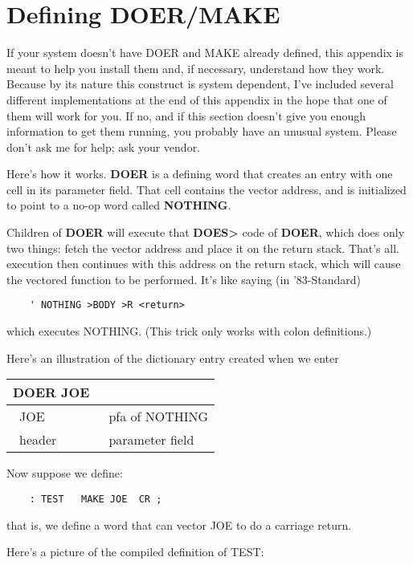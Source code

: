 \chapter{Defining
DOER/MAKE}
If your system doesn't have DOER and MAKE
already defined, this appendix
is meant to help you install them and, if necessary, understand
how they work.  Because by its nature this construct is system
dependent, I've included several different implementations at the end of
this appendix in the hope that one of them will work for you.  If no, and if
this section doesn't give you enough information to get them running,
you probably have an unusual system.  Please don't ask me for help; ask
your \Forth{} vendor.

Here's how it works.  {\bf DOER} is a defining word that creates an entry
with one cell in its parameter field. That cell contains the vector address,
and is initialized to point to a no-op word called {\bf NOTHING}.

Children of {\bf DOER} will execute that {\bf DOES> } code of {\bf DOER}, which
does only two things:  fetch the vector address and place it on the return
stack.  That's all.  \Forth{} execution then continues with this address on
the return stack, which will cause the vectored function to be performed.
It's like saying (in '83-Standard)
\begin{verbatim}
    ' NOTHING >BODY >R <return>
\end{verbatim}
which executes NOTHING.  (This trick only works with colon definitions.)

Here's an illustration of the dictionary entry created when we enter


{\sf
\bigskip
\begin{tabular}{@{} l l@{}}
DOER JOE & \\
\hline
\vline\ JOE & \vline\ pfa of NOTHING \vline \\
\hline
\ header &\  parameter field
\end{tabular}
\bigskip
}


Now suppose we define:
\begin{verbatim}
    : TEST   MAKE JOE  CR ;
\end{verbatim}
that is, we define a word that can vector JOE to do a carriage return.

Here's a picture of the compiled definition of TEST:

